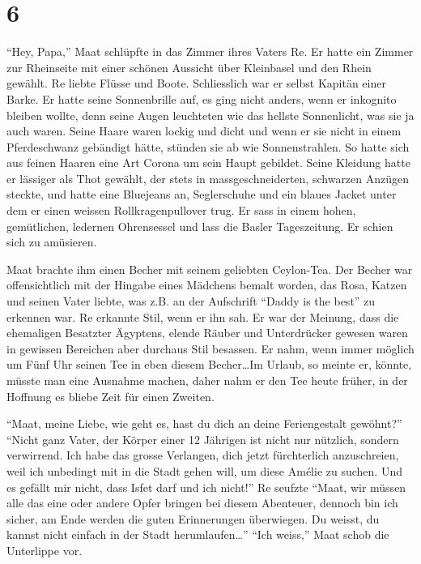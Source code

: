 \documentclass[11pt,titlepage,a5paper]{book}
\begin{document}
\section*{6}


"`Hey, Papa,"' Maat schlüpfte in das Zimmer ihres Vaters Re. Er hatte ein Zimmer zur Rheinseite mit einer schönen Aussicht über Kleinbasel und den Rhein gewählt. Re liebte Flüsse und Boote. Schliesslich war er selbst Kapitän einer Barke. Er hatte seine Sonnenbrille auf, es ging nicht anders, wenn er inkognito bleiben wollte, denn seine Augen leuchteten wie das hellste Sonnenlicht, was sie ja auch waren. Seine Haare waren lockig und dicht und wenn er sie nicht in einem Pferdeschwanz gebändigt hätte, stünden sie ab wie Sonnenstrahlen. So hatte sich aus feinen Haaren eine Art Corona um sein Haupt gebildet. Seine Kleidung hatte er lässiger als Thot gewählt, der stets in massgeschneiderten, schwarzen Anzügen steckte, und hatte eine Bluejeans an, Seglerschuhe und ein blaues Jacket unter dem er einen weissen Rollkragenpullover trug. Er sass in einem hohen, gemütlichen, ledernen Ohrensessel und lass die Basler Tageszeitung. Er schien sich zu amüsieren.

Maat brachte ihm einen Becher mit seinem geliebten Ceylon-Tea. Der Becher war offensichtlich mit der Hingabe eines Mädchens bemalt worden, das Rosa, Katzen und seinen Vater liebte, was z.B. an der Aufschrift "`Daddy is the best"' zu erkennen war. Re erkannte Stil, wenn er ihn sah. Er war der Meinung, dass die ehemaligen Besatzter Ägyptens, elende Räuber und Unterdrücker gewesen waren in gewissen Bereichen aber durchaus Stil besassen. Er nahm, wenn immer möglich um Fünf Uhr seinen Tee in eben diesem Becher\dots Im Urlaub, so meinte er, könnte, müsste man eine Ausnahme machen, daher nahm er den Tee heute früher, in der Hoffnung es bliebe Zeit für einen Zweiten.

"`Maat, meine Liebe, wie geht es, hast du dich an deine Feriengestalt gewöhnt?"' "`Nicht ganz Vater, der Körper einer 12 Jährigen ist nicht nur nützlich, sondern verwirrend. Ich habe das grosse Verlangen, dich jetzt fürchterlich anzuschreien, weil ich unbedingt mit in die Stadt gehen will, um diese Amélie zu suchen. Und es gefällt mir nicht, dass Isfet darf und ich nicht!"' Re seufzte "`Maat, wir müssen alle das eine oder andere Opfer bringen bei diesem Abenteuer, dennoch bin ich sicher, am Ende werden die guten Erinnerungen überwiegen. Du weisst, du kannst nicht einfach in der Stadt herumlaufen\dots "' "`Ich weiss,"' Maat schob die Unterlippe vor.
\end{document}
